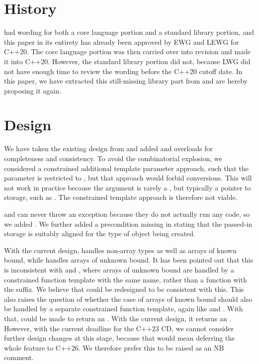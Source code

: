\section{History}
\cite{P0593R5} had wording for both a core language portion and a standard library portion, and this paper in its entirety has already been approved by EWG and LEWG for C++20. The core language portion was then carried over into revision \cite{P0593R6} and  made it into C++20. However, the standard library portion did not, because LWG did not have enough time to review the wording before the C++20 cutoff date. In this paper, we have extracted this still-missing library part from \cite{P0593R5} and are hereby proposing it again.

\section{Design}

We have taken the existing design from \cite{P0593R5} and added  and  overloads for completeness and consistency. To avoid the combinatorial explosion, we considered a constrained additional template parameter approach, such that the parameter is restricted to , but that approach would forbid conversions. This will not work in practice because the argument is rarely a , but typically a pointer to storage, such as . The constrained template approach is therefore not viable.

 and  can never throw an exception because they do not actually run any code, so we added . We further added a precondition missing in \cite{P0593R5} stating that the passed-in storage is suitably aligned for the type of object being created.

With the current design,  handles non-array types as well as arrays of known bound, while  handles arrays of unknown bound. It has been pointed out that this is inconsistent with  and , where arrays of unknown bound are handled by a constrained function template with the same name, rather than a function with the  suffix. We believe that  could be redesigned to be consistent with this. This also raises the question of whether the case of arrays of known bound should also be handled by a separate constrained function template, again like  and . With that,  could be made to return an . With the current design, it returns an . However, with the current deadline for the C++23 CD, we cannot consider further design changes at this stage, because that would mean deferring the whole feature to C++26. We therefore prefer this to be raised as an NB comment.

